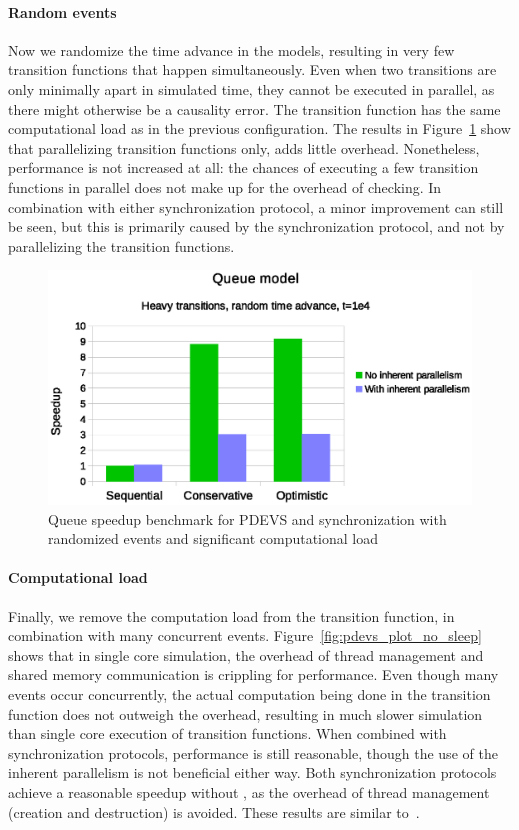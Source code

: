 \paragraph{Random events}
Now we randomize the time advance in the models, resulting in very few transition functions that happen simultaneously.
Even when two transitions are only minimally apart in simulated time, they cannot be executed in parallel, as there might otherwise be a causality error.
The transition function has the same computational load as in the previous configuration. 
The results in Figure~\ref{fig:pdevs_plot_random_sleep} show that parallelizing transition functions only, adds little overhead. 
Nonetheless, performance is not increased at all: the chances of executing a few transition functions in parallel does not make up for the overhead of checking.
In combination with either synchronization protocol, a minor improvement can still be seen, but this is primarily caused by the synchronization protocol, and not by parallelizing the transition functions.

\begin{figure}
	\center
	\includegraphics[width=\columnwidth]{fig/pdevs_random_sleep.eps}
	\caption{Queue speedup benchmark for PDEVS and synchronization with randomized events and significant computational load}
	\label{fig:pdevs_plot_random_sleep}
\end{figure}

\paragraph{Computational load}
Finally, we remove the computation load from the transition function, in combination with many concurrent events.
Figure~\ref{fig:pdevs_plot_no_sleep} shows that in single core simulation, the overhead of thread management and shared memory communication is crippling for performance.
Even though many events occur concurrently, the actual computation being done in the transition function does not outweigh the overhead, resulting in much slower simulation than single core execution of transition functions.
When combined with synchronization protocols, performance is still reasonable, though the use of the inherent parallelism is not beneficial either way.
Both synchronization protocols achieve a reasonable speedup without \pSim, as the overhead of thread management (creation and destruction) is avoided.
These results are similar to~\cite{Himmelspach}.
 
